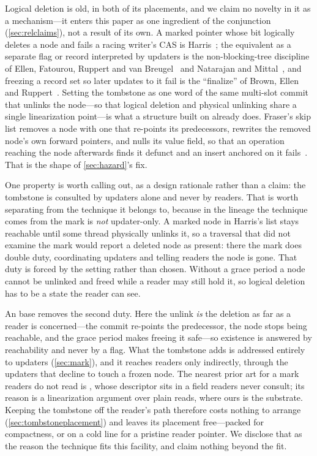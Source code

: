 \documentclass[11pt]{article}
\begin{document}
Logical deletion is old, in both of its placements, and we claim no novelty in it
as a mechanism---it enters this paper as one ingredient of the conjunction
(\cref{sec:relclaims}), not a result of its own. A marked pointer whose bit
logically deletes a node and fails a racing
writer's CAS is Harris~\citep{harris2001lists}; the equivalent as a separate flag
or record interpreted by updaters is the non-blocking-tree discipline of Ellen,
Fatourou, Ruppert and van Breugel~\citep{ellen2010nbbst} and Natarajan and
Mittal~\citep{natarajan2014bst}, and freezing a record set so later updates to it
fail is the  ``finalize'' of Brown, Ellen and
Ruppert~\citep{brown2013scx}. Setting the tombstone as one word of the same
multi-slot commit that unlinks the node---so that logical deletion and physical
unlinking share a single linearization point---is what a structure built on
\mcas already does. Fraser's \mcas skip list removes a node with one \mcas that
re-points its predecessors, rewrites the removed node's own forward pointers,
and nulls its value field, so that an operation reaching the node afterwards
finds it defunct and an insert anchored on it
fails~\citep{fraser2004lockfreedom}. That is the shape of \cref{sec:hazard}'s
fix.

One property is worth calling out, as a design rationale rather than a claim: the
tombstone is consulted by updaters alone and never by readers. That is worth
separating from the technique it belongs to, because in the lineage the technique
comes from the mark is \emph{not} updater-only. A marked node in
Harris's list stays reachable until some thread physically unlinks it, so a
traversal that did not examine the mark would report a deleted node as present:
there the mark does double duty, coordinating updaters and telling readers the
node is gone. That duty is forced by the setting rather than chosen. Without a
grace period a node cannot be unlinked and freed while a reader may still hold
it, so logical deletion has to be a state the reader can see.

An \rcu base removes the second duty. Here the unlink \emph{is} the deletion as
far as a reader is concerned---the commit re-points the predecessor, the node
stops being reachable, and the grace period makes freeing it safe---so existence
is answered by reachability and never by a flag. What the tombstone adds is
addressed entirely to updaters (\cref{sec:mark}), and it reaches readers only
indirectly, through the updaters that decline to touch a frozen node. The nearest
prior art for a mark readers do not read is , whose descriptor sits in
a field readers never consult; its reason is a linearization argument over plain
reads, where ours is the substrate. Keeping the tombstone off the reader's path
therefore costs nothing to arrange (\cref{sec:tombstoneplacement}) and leaves its
placement free---packed for compactness, or on a cold line for a pristine reader
pointer. We disclose that as the reason the technique fits this facility, and
claim nothing beyond the fit.
\end{document}
